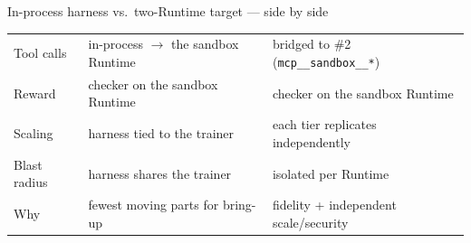 \documentclass[aspectratio=169]{beamer}
\begin{document}
\begin{frame}{In-process harness vs.\ two-Runtime target --- side by side}
\begin{center}
\begin{tabular}{lll}
    Tool calls   & in-process $\to$ the sandbox Runtime & bridged to \#2 (\texttt{mcp\_\_sandbox\_\_*}) \\
    Reward       & checker on the sandbox Runtime      & checker on the sandbox Runtime \\
    Scaling      & harness tied to the trainer         & each tier replicates independently \\
    Blast radius & harness shares the trainer          & isolated per Runtime \\
    Why          & fewest moving parts for bring-up    & fidelity + independent scale/security \\
    \bottomrule
  \end{tabular}
  \end{center}
\end{frame}
\end{document}
